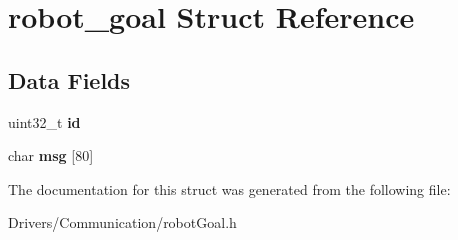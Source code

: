 \hypertarget{structrobot__goal}{}\section{robot\+\_\+goal Struct Reference}
\label{structrobot__goal}
\subsection*{Data Fields}
\begin{DoxyCompactItemize}
\item 
\mbox{\label{structrobot__goal_abaabdc509cdaba7df9f56c6c76f3ae19}} 
uint32\+\_\+t {\bfseries id}
\item 
\mbox{\label{structrobot__goal_a3d523ddd4d9b8eafb9241f3c94fc66da}} 
char {\bfseries msg} \mbox{[}80\mbox{]}
\end{DoxyCompactItemize}


The documentation for this struct was generated from the following file\+:\begin{DoxyCompactItemize}
\item 
Drivers/\+Communication/robot\+Goal.\+h\end{DoxyCompactItemize}
